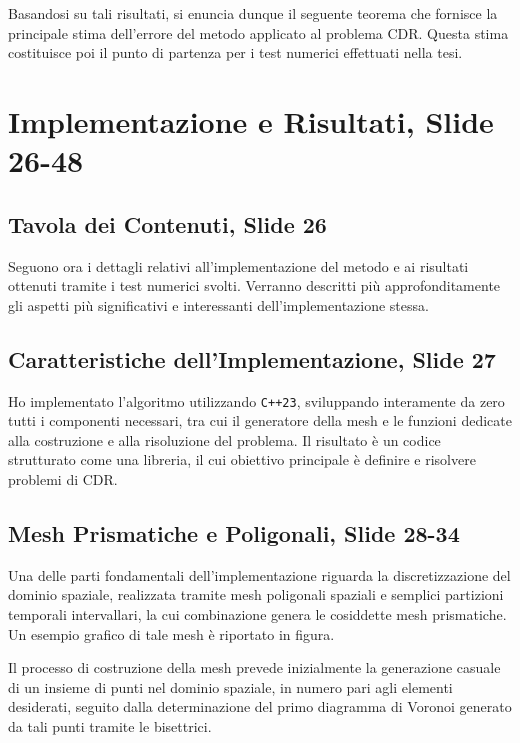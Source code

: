 \documentclass[12pt]{article}
\begin{document}
    Basandosi su tali risultati, si enuncia dunque il seguente teorema che fornisce la principale stima dell'errore del metodo applicato al problema CDR. Questa stima costituisce poi il punto di partenza per i test numerici effettuati nella tesi.

    \newpage
    \section{Implementazione e Risultati, Slide 26-48}

    \subsection{Tavola dei Contenuti, Slide 26}

    Seguono ora i dettagli relativi all'implementazione del metodo e ai risultati ottenuti tramite i test numerici svolti. Verranno descritti più approfonditamente gli aspetti più significativi e interessanti dell'implementazione stessa.

    \subsection{Caratteristiche dell'Implementazione, Slide 27}

    Ho implementato l'algoritmo utilizzando \lstinline{C++23}, sviluppando interamente da zero tutti i componenti necessari, tra cui il generatore della mesh e le funzioni dedicate alla costruzione e alla risoluzione del problema. Il risultato è un codice strutturato come una libreria, il cui obiettivo principale è definire e risolvere problemi di CDR.

    \subsection{Mesh Prismatiche e Poligonali, Slide 28-34}

    Una delle parti fondamentali dell'implementazione riguarda la discretizzazione del dominio spaziale, realizzata tramite mesh poligonali spaziali e semplici partizioni temporali intervallari, la cui combinazione genera le cosiddette mesh prismatiche. Un esempio grafico di tale mesh è riportato in figura.

    Il processo di costruzione della mesh prevede inizialmente la generazione casuale di un insieme di punti nel dominio spaziale, in numero pari agli elementi desiderati, seguito dalla determinazione del primo diagramma di Voronoi generato da tali punti tramite le bisettrici.
\end{document}
